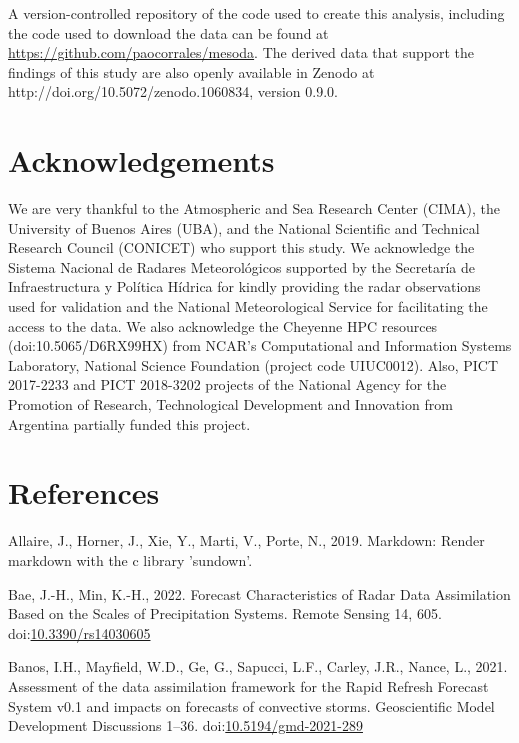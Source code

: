 \documentclass[authoryear,preprint,review,12pt]{elsarticle} %
\begin{document}
A version-controlled repository of the code used to create this analysis, including the code used to download the data can be found at \url{https://github.com/paocorrales/mesoda}. The derived data that support the findings of this study are also openly available in Zenodo at http://doi.org/10.5072/zenodo.1060834, version 0.9.0.

\hypertarget{acknowledgements}{%
\section*{Acknowledgements}\label{acknowledgements}}

We are very thankful to the Atmospheric and Sea Research Center (CIMA), the University of Buenos Aires (UBA), and the National Scientific and Technical Research Council (CONICET) who support this study. We acknowledge the Sistema Nacional de Radares Meteorológicos supported by the Secretaría de Infraestructura y Política Hídrica for kindly providing the radar observations used for validation and the National Meteorological Service for facilitating the access to the data. We also acknowledge the Cheyenne HPC resources (doi:10.5065/D6RX99HX) from NCAR's Computational and Information Systems Laboratory, National Science Foundation (project code UIUC0012). Also, PICT 2017-2233 and PICT 2018-3202 projects of the National Agency for the Promotion of Research, Technological Development and Innovation from Argentina partially funded this project.

\hypertarget{references}{%
\section*{References}\label{references}}

\hypertarget{refs}{}
\leavevmode\hypertarget{ref-allaire2019}{}%
Allaire, J., Horner, J., Xie, Y., Marti, V., Porte, N., 2019. Markdown: Render markdown with the c library 'sundown'.

\leavevmode\hypertarget{ref-bae2022}{}%
Bae, J.-H., Min, K.-H., 2022. Forecast Characteristics of Radar Data Assimilation Based on the Scales of Precipitation Systems. Remote Sensing 14, 605. doi:\href{https://doi.org/10.3390/rs14030605}{10.3390/rs14030605}

\leavevmode\hypertarget{ref-banos2021}{}%
Banos, I.H., Mayfield, W.D., Ge, G., Sapucci, L.F., Carley, J.R., Nance, L., 2021. Assessment of the data assimilation framework for the Rapid Refresh Forecast System v0.1 and impacts on forecasts of convective storms. Geoscientific Model Development Discussions 1--36. doi:\href{https://doi.org/10.5194/gmd-2021-289}{10.5194/gmd-2021-289}
\end{document}
